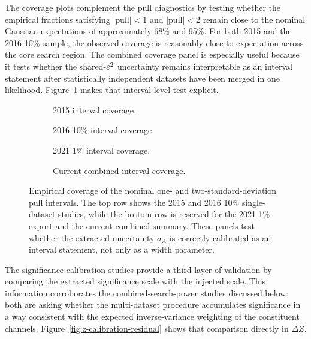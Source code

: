 The coverage plots complement the pull diagnostics by testing whether the empirical
fractions satisfying $|\mathrm{pull}|<1$ and $|\mathrm{pull}|<2$ remain close to the
nominal Gaussian expectations of approximately 68\% and 95\%. For both 2015 and the
2016 10\% sample, the observed coverage is reasonably close to expectation across the
core search region. The combined coverage panel is especially useful because it tests
whether the shared-$\varepsilon^2$ uncertainty remains interpretable as an interval statement
after statistically independent datasets have been merged in one likelihood.
Figure~\ref{fig:coverage} makes that interval-level test explicit.

\begin{figure}[p]
\centering
\begin{subfigure}[t]{0.48\linewidth}
  \centering
  \caption{2015 interval coverage.}
\end{subfigure}
\hfill
\begin{subfigure}[t]{0.48\linewidth}
  \centering
  \caption{2016 10\% interval coverage.}
\end{subfigure}
\vspace{0.8em}

\begin{subfigure}[t]{0.48\linewidth}
  \centering
  \caption{2021 1\% interval coverage.}
\end{subfigure}
\hfill
\begin{subfigure}[t]{0.48\linewidth}
  \centering
  \caption{Current combined interval coverage.}
\end{subfigure}
\caption{Empirical coverage of the nominal one- and two-standard-deviation pull
intervals. The top row shows the 2015 and 2016 10\% single-dataset studies, while the
bottom row is reserved for the 2021 1\% export and the current combined summary. These
panels test whether the extracted uncertainty $\sigma_A$ is correctly calibrated as an
interval statement, not only as a width parameter.}
\label{fig:coverage}
\end{figure}

The significance-calibration studies provide a third layer of validation by comparing
the extracted significance scale with the injected scale. This information corroborates
the combined-search-power studies discussed below: both are asking whether the
multi-dataset procedure accumulates significance in a way consistent with the expected
inverse-variance weighting of the constituent channels. Figure~\ref{fig:z-calibration-residual}
shows that comparison directly in $\Delta Z$.

